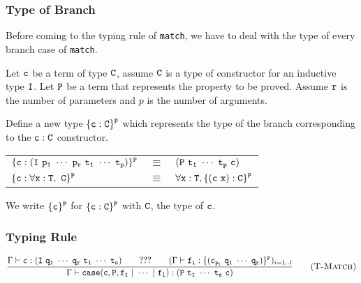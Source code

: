 \subsubsection{Type of Branch}
Before coming to the typing rule of {\tt match}, we have to deal with the type of every branch case of {\tt match}.\par
Let $\tt c$ be a term of type $\tt C$, assume $\tt C$ is a type of constructor for an inductive type $\tt I$. Let
$\tt P$ be a term that represents the property to be proved. Assume $\tt r$ is the number of parameters and 
$p$ is the number of arguments.\par
Define a new type $\tt \{c:C\}^P$ which represents the type of the branch corresponding to the $\tt c:C$ constructor.
\begin{center}
\begin{tabular}{lcl}
$\tt \{c:(I\ p_1\ \cdots\ p_r\ t_1\ \cdots\ t_p)\}^P$ & $\equiv$ & $\tt (P\ t_1\ \cdots\ t_p\ c)$\\
$\tt \{c:\forall x:T,\ C\}^P$ & $\equiv$ & $\tt \forall x:T, \{(c\ x):C\}^P$
\end{tabular}
\end{center}
We write $\tt\{c\}^P$ for $\tt\{c:C\}^P$ with $\tt C$, the type of $\tt c$.

\subsubsection{Typing Rule}
\begin{equation*}
\frac{\Gamma\vdash{\tt c:(I\ q_1\ \cdots\ q_r\ t_1\ \cdots\ t_s)}\qquad 
        ???\qquad
    (\Gamma\vdash{\tt f_i:\{(c_{p_i}\ q_1\ \cdots\ q_r)\}^P})_{i=1..l}}
    {\Gamma\vdash{\tt case(c,P,f_1\ |\ \cdots\ |\ f_l):(P\ t_1\ \cdots\ t_s\ c)}}
    \tag{\sc T-Match}
\end{equation*}
